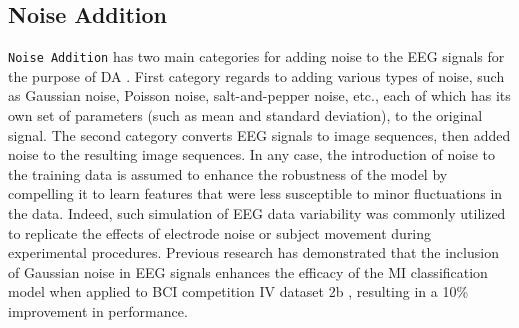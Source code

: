 \documentclass[runningheads]{llncs}
\begin{document}
\subsection{Noise Addition}
\texttt{Noise Addition} has two main categories for adding noise to the EEG signals for the purpose of DA \cite{lashgari2020data}.  First category regards to adding various types of noise, such as Gaussian noise, Poisson noise, salt-and-pepper noise, etc., each of which has its own set of parameters (such as mean and standard deviation), to the original signal.  The second category converts EEG signals to image sequences, then added noise to the resulting image sequences. In any case, the introduction of noise to the training data is assumed to enhance the robustness of the model by compelling it to learn features that were less susceptible to minor fluctuations in the data.  Indeed, such simulation of EEG data variability was commonly utilized to replicate the effects of electrode noise or subject movement during experimental procedures.  Previous research has demonstrated that the inclusion of Gaussian noise in EEG signals enhances the efficacy of the MI classification model when applied to BCI competition IV dataset 2b \cite{brunner2008bci} , resulting in a 10\% improvement in performance.



\end{document}
